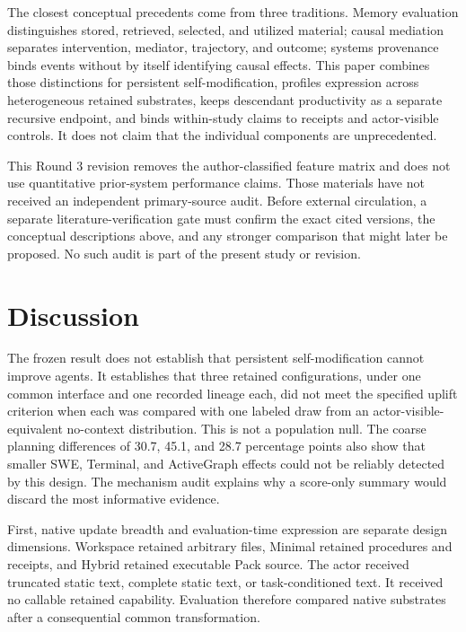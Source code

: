 \documentclass[10pt,twocolumn]{article}
\begin{document}
The closest conceptual precedents come from three traditions. Memory
evaluation distinguishes stored, retrieved, selected, and utilized
material; causal mediation separates intervention, mediator, trajectory,
and outcome; systems provenance binds events without by itself
identifying causal effects. This paper combines those distinctions for
persistent self-modification, profiles expression across heterogeneous
retained substrates, keeps descendant productivity as a separate
recursive endpoint, and binds within-study claims to receipts and
actor-visible controls. It does not claim that the individual components
are unprecedented.

This Round 3 revision removes the author-classified feature matrix and
does not use quantitative prior-system performance claims. Those
materials have not received an independent primary-source audit. Before
external circulation, a separate literature-verification gate must
confirm the exact cited versions, the conceptual descriptions above, and
any stronger comparison that might later be proposed. No such audit is
part of the present study or revision.

\clearpage

\section{Discussion}\label{discussion}

The frozen result does not establish that persistent self-modification
cannot improve agents. It establishes that three retained
configurations, under one common interface and one recorded lineage
each, did not meet the specified uplift criterion when each was compared
with one labeled draw from an actor-visible-equivalent no-context
distribution. This is not a population null. The coarse planning
differences of 30.7, 45.1, and 28.7 percentage points also show that
smaller SWE, Terminal, and ActiveGraph effects could not be reliably
detected by this design. The mechanism audit explains why a score-only
summary would discard the most informative evidence.

First, native update breadth and evaluation-time expression are separate
design dimensions. Workspace retained arbitrary files, Minimal retained
procedures and receipts, and Hybrid retained executable Pack source. The
actor received truncated static text, complete static text, or
task-conditioned text. It received no callable retained capability.
Evaluation therefore compared native substrates after a consequential
common transformation.
\end{document}
